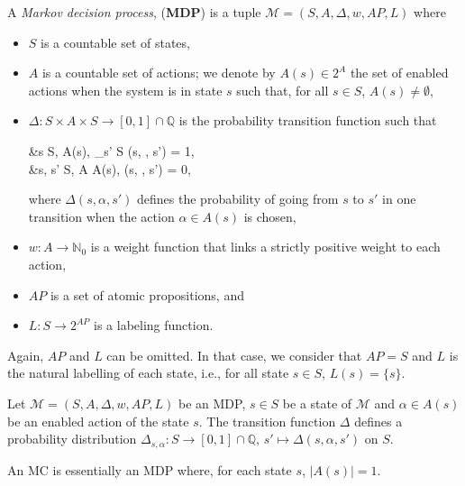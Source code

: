 \begin{definition}
	A \textit{Markov decision process}, (\textbf{MDP}) is a tuple $\mathcal{M}  = (S, A, \Delta, w, AP, L)$ where
	\begin{itemize}
		\item $S$ is a countable set of states,
		\item $A$ is a countable set of actions; we denote by $A(s) \in 2^A$  the set of enabled actions when the system is in state $s$ such that, for all $s \in S$,
    $A(s) \neq \emptyset$,
		\item $\Delta: S \times A \times S \rightarrow [0, 1] \cap \mathbb{Q}$ is the probability transition function such that
		\begin{flalign*}
			&\forall s \in S, \; \forall \alpha \in A(s), \; \sum_{s' \in S} \Delta(s, \alpha, s') = 1,  \\
			&\forall s, s' \in S, \; \forall \alpha \in A \setminus A(s), \; \Delta(s, \alpha, s') = 0,
		\end{flalign*}

			where $\Delta(s, \alpha, s')$ defines the probability of going from $s$ to $s'$ in one transition when the action $\alpha \in A(s)$ is chosen,
    \item $w: A \rightarrow \mathbb{N}_0$ %
      is a weight function that links a strictly positive weight to each action,
    \item $AP$ is a set of atomic propositions, and
    \item $L: S \rightarrow 2^{AP}$ is a labeling function.
	\end{itemize}
\end{definition}
\begin{remark}
  Again, $AP$ and $L$ can be omitted. In that case, we consider that $AP=S$ and $L$ is the natural labelling of each state, i.e., for all state $s \in S$, $L(s) = \{s\}$.
\end{remark}

\begin{property}
  Let $\mathcal{M} = (S,A, \Delta, w, AP, L)$ be an MDP, $s \in S$ be a state of $\mathcal{M}$ and $\alpha \in A(s)$ be an enabled action of the state $s$. The transition function $\Delta$ defines a probability distribution $\Delta_{s, \alpha}: S \rightarrow [0, 1]\cap \mathbb{Q}, \, s' \mapsto \Delta(s, \alpha, s')$ on $S$.
\end{property}
\begin{property}
  An MC is essentially an MDP where, for each state $s$, $|A(s)| = 1$.
\end{property}

